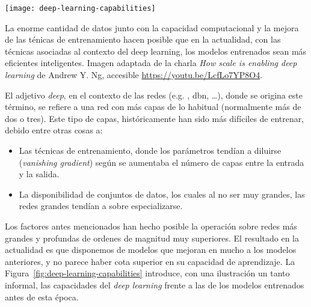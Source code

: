 \begin{marginfigure}
	\texttt{[image: deep-learning-capabilities]}
	\caption[Capacidad de los modelos en función de la cantidad de datos]{La enorme cantidad de datos junto con la capacidad computacional y la mejora de las ténicas de entrenamiento hacen posible que en la actualidad, con las técnicas asociadas al contexto del deep learning, los modelos entrenados sean más eficientes  inteligentes. Imagen adaptada de la charla \textit{How scale is enabling deep learning} de Andrew Y. Ng, accesible \url{https://youtu.be/LcfLo7YP8O4}.}
	\label{fig:deep-learning-capabilities}
\end{marginfigure}

El adjetivo \textit{deep}, en el contexto de las redes (e.g. , \gls{dbn}, \ldots), donde se origina este término, se refiere a una red con más capas de lo habitual (normalmente más de dos o tres). Este tipo de capas, históricamente han sido más difíciles de entrenar, debido entre otras cosas a:

\begin{itemize}
	\item Las técnicas de entrenamiento, donde los parámetros tendían a diluirse (\textit{vanishing gradient}) según se aumentaba el número de capas entre la entrada y la salida.
	\item La disponibilidad de conjuntos de datos, los cuales al no ser muy grandes, las redes grandes tendían a sobre especializarse.
\end{itemize}

Los factores antes mencionados han hecho posible la operación sobre redes más grandes y profundas de ordenes de magnitud muy superiores. El resultado en la actualidad es que disponemos de modelos que mejoran en mucho a los modelos anteriores, y no parece haber cota superior en su capacidad de aprendizaje. La Figura~\ref{fig:deep-learning-capabilities} introduce, con una ilustración un tanto informal, las capacidades del \textit{deep learning} frente a las de los modelos entrenados antes de esta época.

\section{}

